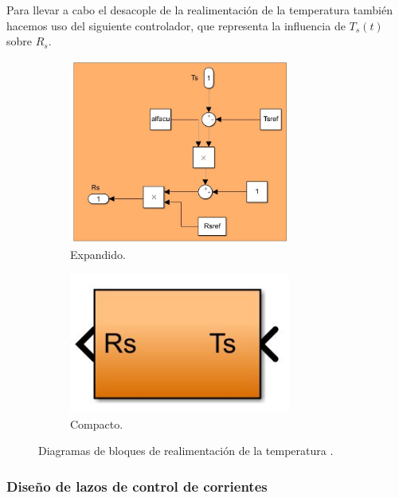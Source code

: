 \documentclass{article}
\begin{document}
Para llevar a cabo el desacople de la realimentación de la temperatura también hacemos uso del 
siguiente controlador, que representa la influencia de $T_s(t)$ sobre $R_s$.

\begin{figure}[H]
    \begin{subfigure}[b]{0.75\textwidth}
        \centering
        \includegraphics[width=0.8\textwidth]{realimentacion_temperatura.jpg}
        \caption{Expandido.}
    \end{subfigure}
    \begin{subfigure}[b]{0.24\textwidth}
        \centering
        \includegraphics[width=0.8\textwidth]{realimentacion_temperatura_compacto.jpg}
        \caption{Compacto.}
    \end{subfigure}
    \caption{Diagramas de bloques de realimentación de la temperatura .}
\end{figure}


\subsubsection{Diseño de lazos de control de corrientes}
\end{document}
